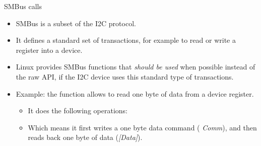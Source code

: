 \begin{frame}{SMBus calls}
  \begin{itemize}
  \item SMBus is a subset of the I2C protocol.
  \item It defines a standard set of transactions, for example to read
    or write a register into a device.
  \item Linux provides SMBus functions that {\em should be used} when
    possible instead of the raw API, if the I2C device uses this
    standard type of transactions.
  \item Example: the  function allows
    to read one byte of data from a device register.
    \begin{itemize}
    \item It does the following operations:
    \item Which means it first writes a one byte data command ({\em
        Comm}), and then reads back one byte of data ({\em [Data]}).
    \end{itemize}
  \end{itemize}
\end{frame}

